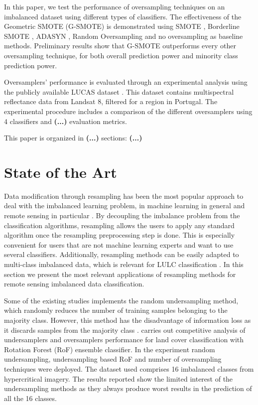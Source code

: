 \documentclass[parskip=full]{scrartcl}
\begin{document}
In this paper, we test the performance of oversampling techniques on an
imbalanced dataset using different types of classifiers. The effectiveness of
the Geometric SMOTE (G-SMOTE) \cite{Douzas2019} is demonstrated using SMOTE
\cite{Chawla2002}, Borderline SMOTE \cite{Han2005}, ADASYN \cite{HaiboHe2008},
Random Oversampling and no oversampling as baseline methods. Preliminary results
show that G-SMOTE outperforms every other oversampling technique, for both
overall prediction power and minority class prediction power.

Oversamplers' performance is evaluated through an experimental analysis using
the publicly available LUCAS dataset \cite{LUCAS2015}. This dataset contains
multispectral reflectance data from Landsat 8, filtered for a region in
Portugal. The experimental procedure includes a comparison of the different
oversamplers using 4 classifiers and \textbf{(...)} evaluation metrics.

This paper is organized in \textbf{(...)} sections: \textbf{(...)}

\section{State of the Art}

Data modification through resampling has been the most popular approach to deal
with the imbalanced learning problem, in machine learning in general
\cite{Douzas2019} and remote sensing in particular \cite{Feng2019}. By
decoupling the imbalance problem from the classification algorithms, resampling
allows the users to apply any standard algorithm once the resampling
preprocessing step is done. This is especially convenient for users that are
not machine learning experts and want to use several classifiers. Additionally,
resampling methods can be easily adapted to multi-class imbalanced data, which
is relevant for LULC classification \cite{Feng2019}. In this section we present
the most relevant applications of resampling methods for remote sensing
imbalanced data classification.

Some of the existing studies implements the random undersampling method,
which randomly reduces the number of training samples  belonging to the
majority class. However, this method has the disadvantage of information loss
as it discards samples from the majority class  \cite{Feng2019}.
\cite{Feng2018} carries out competitive analysis of  undersamplers and
oversamplers performance for land cover classification with  Rotation Forest
(RoF) ensemble classifier. In the experiment random  undersampling,
undersampling based RoF and number of oversampling techniques  were deployed.
The dataset used comprises 16 imbalanced classes from  hypercritical imagery.
The results reported show the limited interest of the  undersampling methods as
they always produce worst results in the prediction of all the 16 classes.
\end{document}
